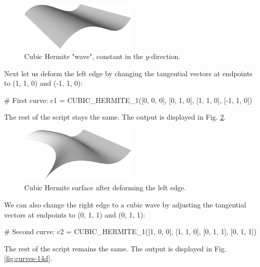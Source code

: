 \begin{figure}[!ht]
\begin{center}
\includegraphics[width=0.5\textwidth]{img/curves-14b.png}
\end{center}
\vspace{-6mm}
\caption{Cubic Hermite "wave", constant in the $y$-direction.}
\label{fig:curves-14b}
\end{figure}
\noindent
Next let us deform the left edge by changing the tangential 
vectors at endpoints to (1, 1, 0) and (-1, 1, 0):

\begin{bluecode}
# First curve:
c1 = CUBIC_HERMITE_1([0, 0, 0], [0, 1, 0], [1, 1, 0], [-1, 1, 0])
\end{bluecode}
The rest of the script stays the same. The output is displayed in Fig. \ref{fig:curves-14c}.
\newpage

\begin{figure}[!ht]
\begin{center}
\includegraphics[width=0.5\textwidth]{img/curves-14c.png}
\end{center}
\vspace{-6mm}
\caption{Cubic Hermite surface after deforming the left edge.}
\label{fig:curves-14c}
\end{figure}
\noindent
We can also change the right edge to a cubic wave by adjusting 
the tangential vectors at endpoints to (0, 1, 1) and (0, 1, 1):

\begin{bluecode}
# Second curve:
c2 = CUBIC_HERMITE_1([1, 0, 0], [1, 1, 0], [0, 1, 1], [0, 1, 1])
\end{bluecode}
The rest of the script remains the same. The output is displayed in Fig. \ref{fig:curves-14d}.

